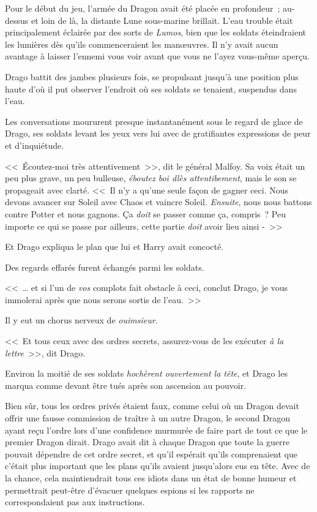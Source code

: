 Pour le début du jeu, l'armée du Dragon avait été placée en profondeur~; au-dessus et loin de là, la distante Lune sous-marine brillait. L'eau trouble était principalement éclairée par des sorts de \emph{Lumos}, bien que les soldats éteindraient les lumières dès qu'ils commenceraient les manœuvres. Il n'y avait aucun avantage à laisser l'ennemi vous voir avant que vous ne l'ayez vous-même aperçu.

Drago battit des jambes plusieurs fois, se propulsant jusqu'à une position plus haute d'où il put observer l'endroit où ses soldats se tenaient, suspendus dans l'eau.

Les conversations moururent presque instantanément sous le regard de glace de Drago, ses soldats levant les yeux vers lui avec de gratifiantes expressions de peur et d'inquiétude.

<<~Écoutez-moi très attentivement~>>, dit le général Malfoy. Sa voix était un peu plus grave, un peu bulleuse, \emph{éboutez boi dlès attentibement}, mais le son se propageait avec clarté. <<~Il n'y a qu'une seule façon de gagner ceci. Nous devons avancer sur Soleil avec Chaos et vaincre Soleil. \emph{Ensuite}, nous nous battons contre Potter et nous gagnons. Ça \emph{doit} se passer comme ça, compris~? Peu importe ce qui se passe par ailleurs, cette partie \emph{doit} avoir lieu ainsi -~>>

Et Drago expliqua le plan que lui et Harry avait concocté.

Des regards effarés furent échangés parmi les soldats.

<<~… et si l'un de \emph{vos} complots fait obstacle à ceci, conclut Drago, je vous immolerai après que nous serons sortis de l'eau.~>>

Il y eut un chorus nerveux de \emph{ouimsieur}.

<<~Et tous ceux avec des ordres secrets, assurez-vous de les exécuter \emph{à la lettre}~>>, dit Drago.

Environ la moitié de ses soldats \emph{hochèrent ouvertement la tête}, et Drago les marqua comme devant être tués après son ascension au pouvoir.

Bien sûr, tous les ordres privés étaient faux, comme celui où un Dragon devait offrir une fausse commission de traître à un autre Dragon, le second Dragon ayant reçu l'ordre lors d'une confidence murmurée de faire part de tout ce que le premier Dragon dirait. Drago avait dit à chaque Dragon que toute la guerre pouvait dépendre de cet ordre secret, et qu'il espérait qu'ils comprenaient que c'était plus important que les plans qu'ils avaient jusqu'alors eus en tête. Avec de la chance, cela maintiendrait tous ces idiots dans un état de bonne humeur et permettrait peut-être d'évacuer quelques espions si les rapports ne correspondaient pas aux instructions.

